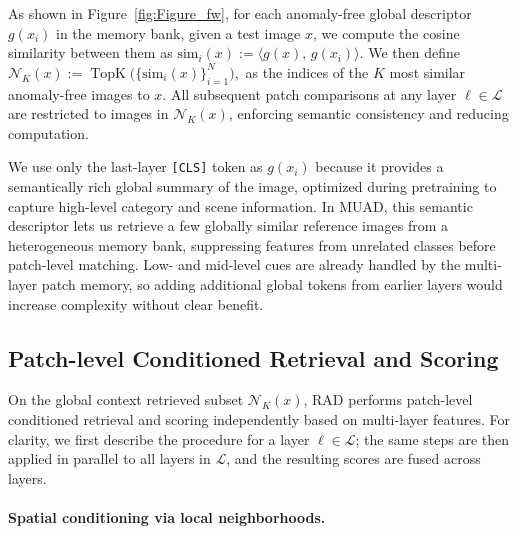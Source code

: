 \documentclass{article}
\theoremstyle{plain}
\theoremstyle{definition}
\theoremstyle{remark}
\begin{document}
As shown in Figure~\ref{fig:Figure_fw}, for each anomaly-free global descriptor $g(x_i)$ in the memory bank, given a test image $x$, we compute the cosine similarity between them as $\label{eq:cls-retrieval}
\mathrm{sim}_i(x)
:=
\big\langle g(x),\, g(x_i) \big\rangle.$
We then define $\mathcal{N}_K(x)
:=
\operatorname{TopK}\big(\{\mathrm{sim}_i(x)\}_{i=1}^{N}\big),$
as the indices of the $K$ most similar anomaly-free images to $x$.
All subsequent patch comparisons at any layer $\ell \in \mathcal{L}$ are restricted to images in $\mathcal{N}_K(x)$, enforcing semantic consistency and reducing computation.


We use only the last-layer \texttt{[CLS]} token as $g(x_i)$ because it provides a semantically rich global summary of the image, optimized during pretraining to capture high-level category and scene information. In MUAD, this semantic descriptor lets us retrieve a few globally similar reference images from a heterogeneous memory bank, suppressing features from unrelated classes before patch-level matching. Low- and mid-level cues are already handled by the multi-layer patch memory, so adding additional global tokens from earlier layers would increase complexity without clear benefit.

\subsection{Patch-level Conditioned Retrieval and Scoring}
\label{sec:retrieval}

On the global context retrieved subset $\mathcal{N}_K(x)$, RAD performs
patch-level conditioned retrieval and scoring independently based on multi-layer features.
For clarity, we first describe the procedure for a layer
$\ell \in \mathcal{L}$; the same steps are then applied in parallel to all
layers in $\mathcal{L}$, and the resulting scores are fused across layers.

\paragraph{Spatial conditioning via local neighborhoods.}

\end{document}

